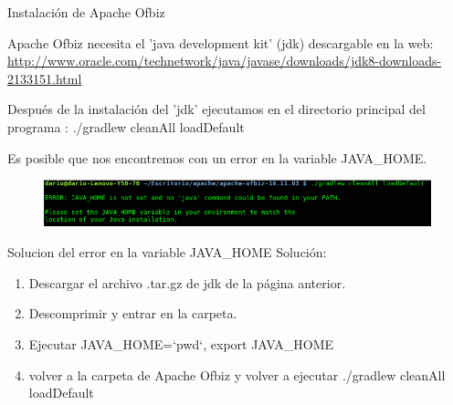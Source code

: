 \begin{frame}{Instalación de Apache Ofbiz}

	Apache Ofbiz necesita el 'java development kit' (jdk) descargable en la web: \href{http://www.oracle.com/technetwork/java/javase/downloads/jdk8-downloads-2133151.html}{http://www.oracle.com/technetwork/java/javase/downloads/jdk8-downloads-2133151.html}
	
	Después de la instalación del 'jdk' ejecutamos en el directorio principal del programa : ./gradlew cleanAll loadDefault
	
	Es posible que nos encontremos con un error en la variable JAVA\_HOME.
	\begin{figure}[H]
		\centering
		\includegraphics[width=1.0\linewidth]{img/3.png}
	\end{figure}

\end{frame}

\begin{frame}{Solucion del error en la variable JAVA\_HOME}
	Solución:
	\begin{enumerate}
		\item Descargar el archivo .tar.gz de jdk de la página anterior.
		\item Descomprimir y entrar en la carpeta.
		\item Ejecutar JAVA\_HOME=`pwd`, export JAVA\_HOME
		\item volver a la carpeta de Apache Ofbiz y volver a ejecutar ./gradlew cleanAll loadDefault
	\end{enumerate}

\end{frame}

